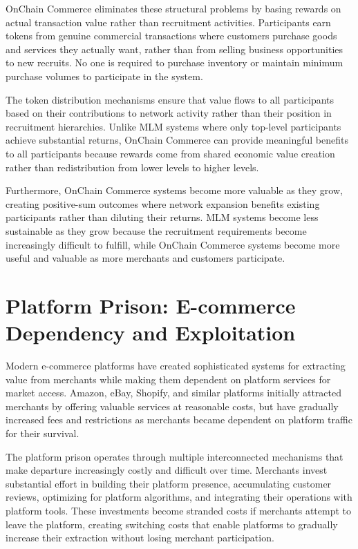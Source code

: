 \documentclass[
  Letterpaper,
]{scrbook}
\begin{document}
OnChain Commerce eliminates these structural problems by basing rewards
on actual transaction value rather than recruitment activities.
Participants earn tokens from genuine commercial transactions where
customers purchase goods and services they actually want, rather than
from selling business opportunities to new recruits. No one is required
to purchase inventory or maintain minimum purchase volumes to
participate in the system.

The token distribution mechanisms ensure that value flows to all
participants based on their contributions to network activity rather
than their position in recruitment hierarchies. Unlike MLM systems where
only top-level participants achieve substantial returns, OnChain
Commerce can provide meaningful benefits to all participants because
rewards come from shared economic value creation rather than
redistribution from lower levels to higher levels.

Furthermore, OnChain Commerce systems become more valuable as they grow,
creating positive-sum outcomes where network expansion benefits existing
participants rather than diluting their returns. MLM systems become less
sustainable as they grow because the recruitment requirements become
increasingly difficult to fulfill, while OnChain Commerce systems become
more useful and valuable as more merchants and customers participate.

\section{Platform Prison: E-commerce Dependency and
Exploitation}\label{platform-prison-e-commerce-dependency-and-exploitation}

Modern e-commerce platforms have created sophisticated systems for
extracting value from merchants while making them dependent on platform
services for market access. Amazon, eBay, Shopify, and similar platforms
initially attracted merchants by offering valuable services at
reasonable costs, but have gradually increased fees and restrictions as
merchants became dependent on platform traffic for their survival.

The platform prison operates through multiple interconnected mechanisms
that make departure increasingly costly and difficult over time.
Merchants invest substantial effort in building their platform presence,
accumulating customer reviews, optimizing for platform algorithms, and
integrating their operations with platform tools. These investments
become stranded costs if merchants attempt to leave the platform,
creating switching costs that enable platforms to gradually increase
their extraction without losing merchant participation.
\end{document}
